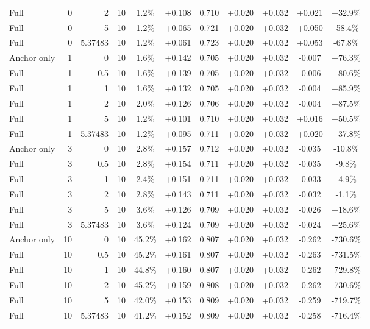 \begin{table}[htbp]
\begin{tabular}{lrrrccccccc}
Full & 0 & 2 & 10 & 1.2\% & +0.108 & 0.710 & +0.020 & +0.032 & +0.021 & +32.9\% \\
Full & 0 & 5 & 10 & 1.2\% & +0.065 & 0.721 & +0.020 & +0.032 & +0.050 & -58.4\% \\
Full & 0 & 5.37483 & 10 & 1.2\% & +0.061 & 0.723 & +0.020 & +0.032 & +0.053 & -67.8\% \\
Anchor only & 1 & 0 & 10 & 1.6\% & +0.142 & 0.705 & +0.020 & +0.032 & -0.007 & +76.3\% \\
Full & 1 & 0.5 & 10 & 1.6\% & +0.139 & 0.705 & +0.020 & +0.032 & -0.006 & +80.6\% \\
Full & 1 & 1 & 10 & 1.6\% & +0.132 & 0.705 & +0.020 & +0.032 & -0.004 & +85.9\% \\
Full & 1 & 2 & 10 & 2.0\% & +0.126 & 0.706 & +0.020 & +0.032 & -0.004 & +87.5\% \\
Full & 1 & 5 & 10 & 1.2\% & +0.101 & 0.710 & +0.020 & +0.032 & +0.016 & +50.5\% \\
Full & 1 & 5.37483 & 10 & 1.2\% & +0.095 & 0.711 & +0.020 & +0.032 & +0.020 & +37.8\% \\
Anchor only & 3 & 0 & 10 & 2.8\% & +0.157 & 0.712 & +0.020 & +0.032 & -0.035 & -10.8\% \\
Full & 3 & 0.5 & 10 & 2.8\% & +0.154 & 0.711 & +0.020 & +0.032 & -0.035 & -9.8\% \\
Full & 3 & 1 & 10 & 2.4\% & +0.151 & 0.711 & +0.020 & +0.032 & -0.033 & -4.9\% \\
Full & 3 & 2 & 10 & 2.8\% & +0.143 & 0.711 & +0.020 & +0.032 & -0.032 & -1.1\% \\
Full & 3 & 5 & 10 & 3.6\% & +0.126 & 0.709 & +0.020 & +0.032 & -0.026 & +18.6\% \\
Full & 3 & 5.37483 & 10 & 3.6\% & +0.124 & 0.709 & +0.020 & +0.032 & -0.024 & +25.6\% \\
Anchor only & 10 & 0 & 10 & 45.2\% & +0.162 & 0.807 & +0.020 & +0.032 & -0.262 & -730.6\% \\
Full & 10 & 0.5 & 10 & 45.2\% & +0.161 & 0.807 & +0.020 & +0.032 & -0.263 & -731.5\% \\
Full & 10 & 1 & 10 & 44.8\% & +0.160 & 0.807 & +0.020 & +0.032 & -0.262 & -729.8\% \\
Full & 10 & 2 & 10 & 45.2\% & +0.159 & 0.808 & +0.020 & +0.032 & -0.262 & -730.6\% \\
Full & 10 & 5 & 10 & 42.0\% & +0.153 & 0.809 & +0.020 & +0.032 & -0.259 & -719.7\% \\
Full & 10 & 5.37483 & 10 & 41.2\% & +0.152 & 0.809 & +0.020 & +0.032 & -0.258 & -716.4\% \\

\end{tabular}
\end{table}
